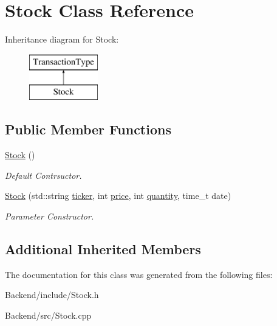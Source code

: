 \hypertarget{class_stock}{}\section{Stock Class Reference}
\label{class_stock}
Inheritance diagram for Stock\+:\begin{figure}[H]
\begin{center}
\leavevmode
\includegraphics[height=2.000000cm]{class_stock}
\end{center}
\end{figure}
\subsection*{Public Member Functions}
\begin{DoxyCompactItemize}
\item 
\mbox{\label{class_stock_adddc4282213b3174a4299cca5a30117c}} 
\mbox{\hyperlink{class_stock_adddc4282213b3174a4299cca5a30117c}{Stock}} ()
\begin{DoxyCompactList}\small\item\em Default Contrsuctor. \end{DoxyCompactList}\item 
\mbox{\label{class_stock_a0527749d03379ba35706fcf48e7effa5}} 
\mbox{\hyperlink{class_stock_a0527749d03379ba35706fcf48e7effa5}{Stock}} (std\+::string \mbox{\hyperlink{class_transaction_type_aad758d557417a18c944dc9849a390391}{ticker}}, int \mbox{\hyperlink{class_transaction_type_a079b40eebde548904529841f8746d4ff}{price}}, int \mbox{\hyperlink{class_transaction_type_a60b6221cf4b0bf30f5c4a4e15893b98d}{quantity}}, time\+\_\+t date)
\begin{DoxyCompactList}\small\item\em Parameter Constructor. \end{DoxyCompactList}\end{DoxyCompactItemize}
\subsection*{Additional Inherited Members}


The documentation for this class was generated from the following files\+:\begin{DoxyCompactItemize}
\item 
Backend/include/Stock.\+h\item 
Backend/src/Stock.\+cpp\end{DoxyCompactItemize}
